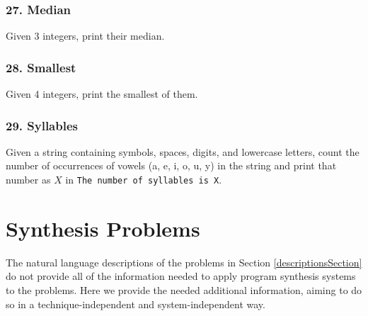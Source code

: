\documentclass{sig-alternate}
\begin{document}
\subsubsection*{27. Median}
Given 3 integers, print their median.

\subsubsection*{28. Smallest}
Given 4 integers, print the smallest of them.

\subsubsection*{29. Syllables}
Given a string containing symbols, spaces, digits, and lowercase letters, count the number of occurrences of vowels (a, e, i, o, u, y) in the string and print that number as $X$ in \texttt{The number of syllables is X}.

\section{Synthesis Problems} \label{synthProbSpec}


The natural language descriptions of the problems in Section \ref{descriptionsSection} do not provide all of the information needed to apply program synthesis systems to the problems. Here we provide the needed additional information, aiming to do so in a technique-independent and system-independent way.
\end{document}
